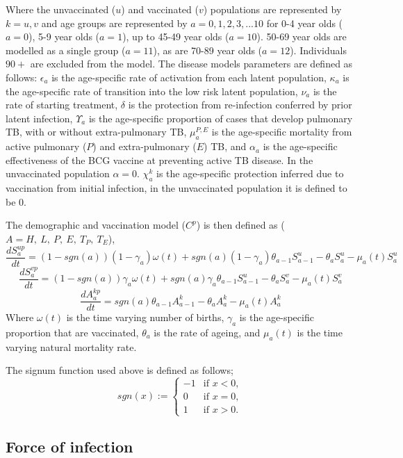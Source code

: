 \documentclass[11pt,twoside]{bristolthesis}
\begin{document}
  Where the unvaccinated (\(u\)) and vaccinated (\(v\)) populations are represented by \(k = u,v\) and age groups are represented by \(a=0,1,2,3, ... 10\) for 0-4 year olds (\(a=0\)), 5-9 year olds (\(a=1\)), up to 45-49 year olds (\(a=10\)). 50-69 year olds are modelled as a single group (\(a=11\)), as are 70-89 year olds (\(a=12\)). Individuals \(90+\) are excluded from the model. The disease models parameters are defined as follows: \(\epsilon_a\) is the age-specific rate of activation from each latent population, \(\kappa_a\) is the age-specific rate of transition into the low risk latent population, \(\nu_a\) is the rate of starting treatment, \(\delta\) is the protection from re-infection conferred by prior latent infection, \(\Upsilon_a\) is the age-specific proportion of cases that develop pulmonary TB, with or without extra-pulmonary TB, \(\mu^{P,E}_a\) is the age-specific mortality from active pulmonary (\(P\)) and extra-pulmonary (\(E\)) TB, and \(\alpha_a\) is the age-specific effectiveness of the BCG vaccine at preventing active TB disease. In the unvaccinated population \(\alpha = 0\). \(\chi^k_a\) is the age-specific protection inferred due to vaccination from initial infection, in the unvaccinated population it is defined to be \(0\).
  
  The demographic and vaccination model (\(C^p\)) is then defined as (\(A = H,\ L,\ P,\ E,\ T_P,\ T_E\)),
  \begin{equation}
  \frac{dS^{up}_{a}}{dt} = (1 - sgn(a)) (1 - \gamma_a)\omega(t) + sgn(a) (1 - \gamma_a)\theta_{a - 1} S^u_{a - 1} - \theta_a S^u_a -\mu_{a}(t) S^u_a
    \label{eq:sus-age-u-model}
  \end{equation}
  \begin{equation}
  \frac{dS^{vp}_{a}}{dt} = (1 - sgn(a)) \gamma_a\omega(t) + sgn(a)\gamma_a\theta_{a - 1} S^u_{a - 1} - \theta_a S^v_a -\mu_{a}(t) S^v_a
    \label{eq:sus-age-v-model}
  \end{equation}
  \begin{equation}
  \frac{dA^{kp}_{a}}{dt} = sgn(a)\theta_{a - 1} A^k_{a - 1} - \theta_a A^k_{a} - \mu_{a}(t) A^k_{a}
    \label{eq:other-age-model}
  \end{equation}
  Where \(\omega(t)\) is the time varying number of births, \(\gamma_a\) is the age-specific proportion that are vaccinated, \(\theta_a\) is the rate of ageing, and \(\mu_a(t)\) is the time varying natural mortality rate.
  
  The signum function used above is defined as follows;
  \begin{equation}
  sgn(x) := \begin{cases}
  -1 & \text{if } x < 0, \\
  0 & \text{if } x = 0, \\
  1 & \text{if } x > 0. \end{cases}
    \label{eq:signum}
  \end{equation}
  \hypertarget{force-of-infection}{%
  \subsection{Force of infection}\label{force-of-infection}}
  
\end{document}
